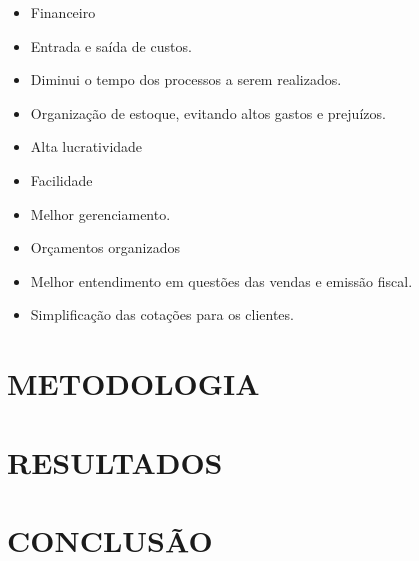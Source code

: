 \documentclass[article, a4paper, 12pt, brazil]{abntex2}
\begin{document}
    \begin{itemize}[noitemsep]
      \item Financeiro
      \item Entrada e saída de custos.
      \item Diminui o tempo dos processos a serem realizados.
      \item Organização de estoque, evitando altos gastos e prejuízos.
      \item Alta lucratividade
      \item Facilidade
      \item Melhor  gerenciamento.
      \item Orçamentos organizados
      \item Melhor entendimento em questões das vendas e emissão fiscal.
      \item Simplificação das cotações para os clientes\cite{fulano}.
   \end{itemize}


   \pagebreak

   \section{METODOLOGIA}
   \pagebreak

   \section{RESULTADOS}
   \pagebreak
   \section{CONCLUSÃO}
   \pagebreak

\printbibliography[title={REFERÊNCIAS}]
\end{document}
